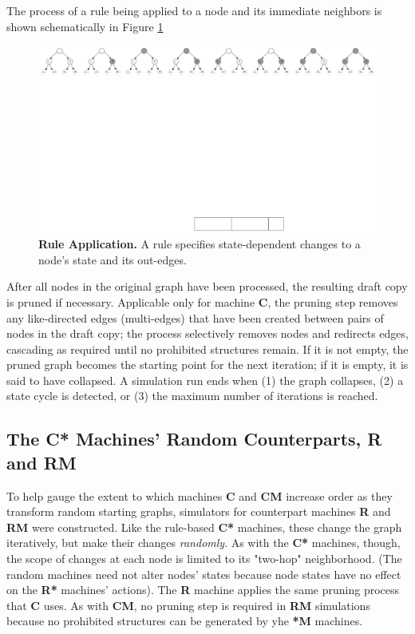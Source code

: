 \documentclass{tufte-handout}
\begin{document}
The process of a rule being applied to a node and its immediate neighbors is shown
schematically in Figure \ref{fig:Ruleapplication}

\begin{figure}
\includegraphics{placeholder.png}
\caption{\textbf{Rule Application.} A rule specifies state-dependent changes to a node's state and its out-edges.}
\label{fig:Ruleapplication}
\end{figure}

After all nodes in the original graph have been processed,
the resulting draft copy is pruned if necessary.
Applicable only for machine \textbf{C}, the pruning step removes
any like-directed edges (multi-edges) that have been created between pairs
of nodes in the draft copy; the process selectively removes nodes
and redirects edges, cascading as required until no prohibited structures remain.
If it is not empty, the pruned graph becomes the starting point for the next iteration;
if it is empty, it is said to have collapsed.
A simulation run ends when (1) the graph collapses, (2) a state cycle is detected,
or (3) the maximum number of iterations is reached.

\subsection{The \textbf{C*} Machines' Random Counterparts, \textbf{R} and \textbf{RM}}

To help gauge the extent to which machines \textbf{C} and \textbf{CM}
increase order as they transform random starting graphs, simulators for counterpart
machines \textbf{R} and \textbf{RM} were constructed. Like the rule-based \textbf{C*} machines,
these change the graph iteratively, but make their changes \textit{randomly}.
As with the \textbf{C*} machines, though, the scope of changes at each node is
limited to its "two-hop" neighborhood. (The random machines need not alter nodes' states
because node states have no effect on the \textbf{R*} machines' actions).
The \textbf{R} machine applies the same pruning process that \textbf{C} uses. As
with \textbf{CM}, no pruning step is required in \textbf{RM} simulations because
no prohibited structures can be generated by yhe \textbf{*M} machines.
\end{document}
